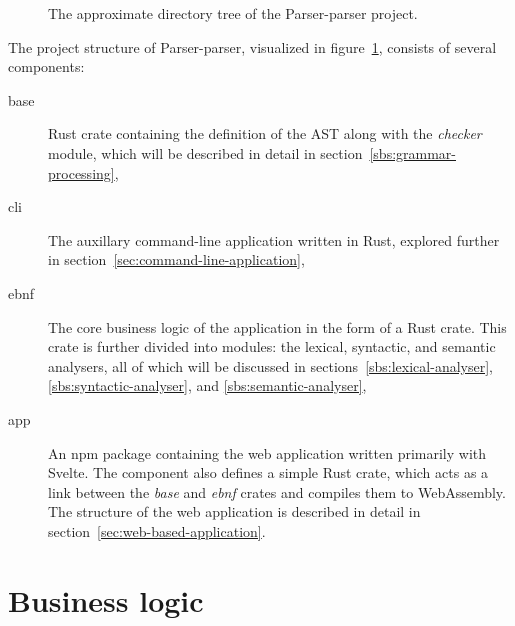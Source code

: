 \documentclass[english,engineering]{wizthesis}
\newcommand{\thisproject}{Parser-parser}
\begin{document}
\begin{figure}[H]
  \centering
  \caption{The approximate directory tree of the \thisproject{} project.}
  \label{fig:file-tree}
\end{figure}

The project structure of \thisproject{}, visualized in
figure~\ref{fig:file-tree}, consists of several components:
\begin{description}
  \item[base] Rust crate containing the definition of the AST along with the
  \emph{checker} module, which will be described in detail in
  section~\ref{sbs:grammar-processing},
  \item[cli] The auxillary command-line application written in Rust, explored
  further in section~\ref{sec:command-line-application},
  \item[ebnf] The core business logic of the application in the form of a Rust
  crate. This crate is further divided into modules: the lexical, syntactic, and
  semantic analysers, all of which will be discussed in
  sections~\ref{sbs:lexical-analyser}, \ref{sbs:syntactic-analyser}, and
  \ref{sbs:semantic-analyser},
  \item[app] An npm package containing the web application written primarily
  with Svelte. The component also defines a simple Rust crate, which acts as a
  link between the \emph{base} and \emph{ebnf} crates and compiles them to
  WebAssembly. The structure of the web application is described in detail in
  section~\ref{sec:web-based-application}.
\end{description}

\section{Business logic}
\end{document}
